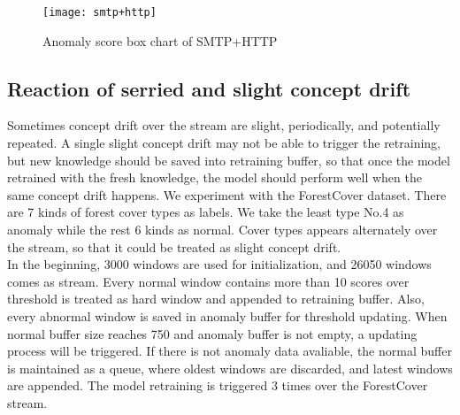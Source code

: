 \begin{figure}[h]
\centering
\texttt{[image: smtp+http]}
\caption[Anomaly score box chart of SMTP+HTTP]{Anomaly score box chart of SMTP+HTTP}
\label{fig:smtp+http}
\end{figure}

\subsection{Reaction of serried and slight concept drift}
\label{sec:reaction}

Sometimes concept drift over the stream are slight, periodically, and potentially repeated. A single slight concept drift may not be able to trigger the retraining, but new knowledge should be saved into retraining buffer, so that once the model retrained with the fresh knowledge, the model should perform well when the same concept drift happens. We experiment with the ForestCover dataset. There are 7 kinds of forest cover types as labels. We take the least type No.4 as anomaly while the rest 6 kinds as normal. Cover types appears alternately over the stream, so that it could be treated as slight concept drift.\\

In the beginning, 3000 windows are used for initialization, and 26050 windows comes as stream.  Every normal window contains more than 10 scores over threshold is treated as hard window and appended to retraining buffer. Also, every abnormal window is saved in anomaly buffer for threshold updating.  When normal buffer size reaches 750 and anomaly buffer is not empty, a updating process will be triggered. If there is not anomaly data avaliable, the normal buffer is maintained as a queue, where oldest windows are discarded, and latest windows are appended. The model retraining is triggered 3 times over the ForestCover stream. 

